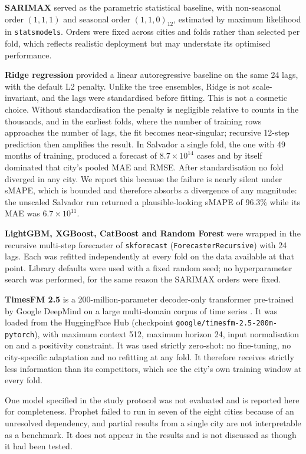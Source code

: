 \documentclass[11pt]{article}
\begin{document}
\textbf{SARIMAX} served as the parametric statistical baseline, with non-seasonal order
$(1,1,1)$ and seasonal order $(1,1,0)_{12}$, estimated by maximum likelihood in
\texttt{statsmodels}. Orders were fixed across cities and folds rather than selected per
fold, which reflects realistic deployment but may understate its optimised performance.

\textbf{Ridge regression} provided a linear autoregressive baseline on the same 24 lags,
with the default L2 penalty. Unlike the tree ensembles, Ridge is not scale-invariant, and
the lags were standardised before fitting. This is not a cosmetic choice. Without
standardisation the penalty is negligible relative to counts in the thousands, and in the
earliest folds, where the number of training rows approaches the number of lags, the fit
becomes near-singular; recursive 12-step prediction then amplifies the result. In
Salvador a single fold, the one with 49 months of training, produced a forecast of
$8.7 \times 10^{14}$ cases and by itself dominated that city's pooled MAE and RMSE. After
standardisation no fold diverged in any city. We report this because the failure is
nearly silent under sMAPE, which is bounded and therefore absorbs a divergence of any
magnitude: the unscaled Salvador run returned a plausible-looking sMAPE of 96.3\% while
its MAE was $6.7 \times 10^{11}$.

\textbf{LightGBM, XGBoost, CatBoost and Random Forest}
\citep{Ke2017lightgbm,Chen2016xgboost,Prokhorenkova2018catboost,Breiman2001} were wrapped
in the recursive multi-step forecaster of \texttt{skforecast}
(\texttt{ForecasterRecursive}) with 24 lags. Each was refitted independently at every
fold on the data available at that point. Library defaults were used with a fixed random
seed; no hyperparameter search was performed, for the same reason the SARIMAX orders were
fixed.

\textbf{TimesFM 2.5} is a 200-million-parameter decoder-only transformer pre-trained by
Google DeepMind on a large multi-domain corpus of time series \citep{Das2024timesfm}. It
was loaded from the HuggingFace Hub (checkpoint
\texttt{google/timesfm-2.5-200m-pytorch}), with maximum context 512, maximum horizon 24,
input normalisation on and a positivity constraint. It was used strictly zero-shot: no
fine-tuning, no city-specific adaptation and no refitting at any fold. It therefore
receives strictly less information than its competitors, which see the city's own
training window at every fold.

One model specified in the study protocol was not evaluated and is reported here for
completeness. Prophet \citep{Taylor2018prophet} failed to run in seven of the eight
cities because of an unresolved dependency, and partial results from a single city are
not interpretable as a benchmark. It does not appear in the results and is not discussed
as though it had been tested.
\end{document}
